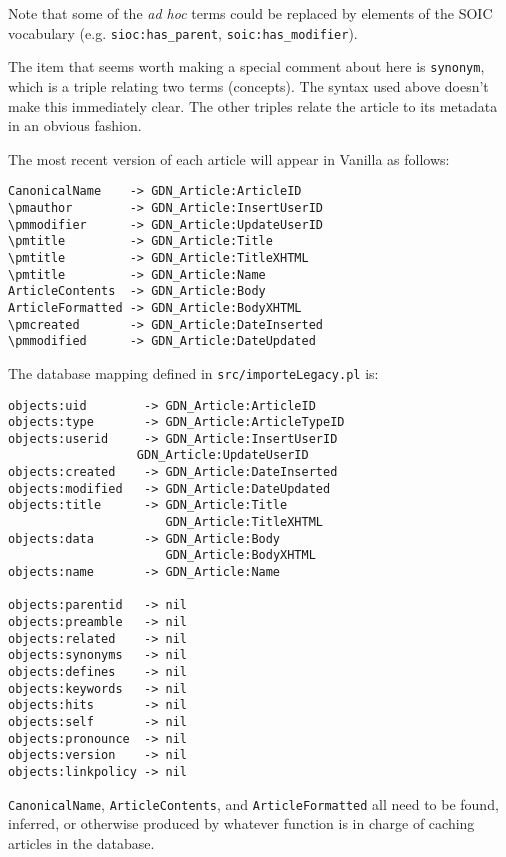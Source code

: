 \documentclass{article}
\begin{document}
Note that some of the \emph{ad hoc} terms could be
replaced by elements of the SOIC vocabulary
(e.g. \verb|sioc:has_parent|, \verb|soic:has_modifier|).


The item that seems worth making a special comment about
here is {\tt synonym}, which is a triple relating two
terms (concepts).  The syntax used above doesn't make this
immediately clear.  The other triples relate the article
to its metadata in an obvious fashion.

The most recent version of each article will appear in
Vanilla as follows:

\begin{verbatim}
CanonicalName    -> GDN_Article:ArticleID
\pmauthor        -> GDN_Article:InsertUserID
\pmmodifier      -> GDN_Article:UpdateUserID
\pmtitle         -> GDN_Article:Title
\pmtitle         -> GDN_Article:TitleXHTML
\pmtitle         -> GDN_Article:Name
ArticleContents  -> GDN_Article:Body
ArticleFormatted -> GDN_Article:BodyXHTML
\pmcreated       -> GDN_Article:DateInserted
\pmmodified      -> GDN_Article:DateUpdated
\end{verbatim}

The database mapping defined in {\tt src/importeLegacy.pl}
is:

\begin{verbatim}
objects:uid        -> GDN_Article:ArticleID
objects:type       -> GDN_Article:ArticleTypeID
objects:userid     -> GDN_Article:InsertUserID
                  GDN_Article:UpdateUserID
objects:created    -> GDN_Article:DateInserted
objects:modified   -> GDN_Article:DateUpdated
objects:title      -> GDN_Article:Title
                      GDN_Article:TitleXHTML
objects:data       -> GDN_Article:Body
                      GDN_Article:BodyXHTML
objects:name       -> GDN_Article:Name

objects:parentid   -> nil
objects:preamble   -> nil
objects:related    -> nil
objects:synonyms   -> nil
objects:defines    -> nil
objects:keywords   -> nil
objects:hits       -> nil
objects:self       -> nil
objects:pronounce  -> nil
objects:version    -> nil
objects:linkpolicy -> nil
\end{verbatim}

\verb|CanonicalName|, \verb|ArticleContents|, and
\verb|ArticleFormatted| all need to be found, inferred, or
otherwise produced by whatever function is in charge of
caching articles in the database.
\end{document}
